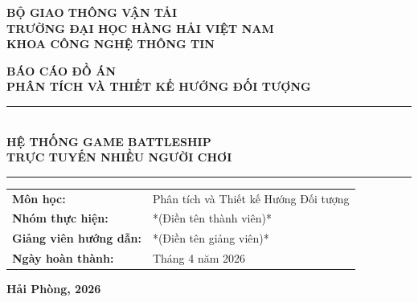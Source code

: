 \documentclass[13pt, a4paper]{extreport}
\begin{document}
\begin{titlepage}
  \centering

  \textbf{\large BỘ GIAO THÔNG VẬN TẢI}\\[3pt]
  \textbf{\large TRƯỜNG ĐẠI HỌC HÀNG HẢI VIỆT NAM}\\[3pt]
  \textbf{\large KHOA CÔNG NGHỆ THÔNG TIN}

  \vspace{2.2cm}

  {\fontsize{22}{28}\selectfont\bfseries BÁO CÁO ĐỒ ÁN}\\[6pt]
  {\fontsize{16}{22}\selectfont\bfseries PHÂN TÍCH VÀ THIẾT KẾ HƯỚNG ĐỐI TƯỢNG}

  \vspace{1.4cm}
  \rule{\linewidth}{1.5pt}\\[10pt]
  {\fontsize{16}{22}\selectfont\bfseries
    HỆ THỐNG GAME BATTLESHIP\\[6pt]
    TRỰC TUYẾN NHIỀU NGƯỜI CHƠI
  }\\[10pt]
  \rule{\linewidth}{1.5pt}

  \vspace{2.2cm}

  \begin{tabular}{@{}ll}
    \textbf{Môn học:}                 & Phân tích và Thiết kế Hướng Đối tượng \\[5pt]
    \textbf{Nhóm thực hiện:}          & *(Điền tên thành viên)* \\[5pt]
    \textbf{Giảng viên hướng dẫn:}    & *(Điền tên giảng viên)* \\[5pt]
    \textbf{Ngày hoàn thành:}         & Tháng 4 năm 2026 \\
  \end{tabular}

  \vfill
  {\large\bfseries Hải Phòng, 2026}
\end{titlepage}

\setcounter{page}{1}
\tableofcontents
\newpage

\setcounter{page}{1}
\end{document}
